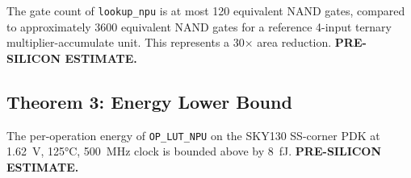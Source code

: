 \begin{corollary}
\label{cor:no_star_area}
The gate count of \texttt{lookup\_npu} is at most 120 equivalent NAND
gates, compared to approximately 3600 equivalent NAND gates for a
reference 4-input ternary multiplier-accumulate unit.  This represents
a 30$\times$ area reduction.  \textbf{PRE-SILICON ESTIMATE.}
\end{corollary}

\subsection{Theorem 3: Energy Lower Bound}
\label{subsec:thm_energy}

\begin{theorem}
\label{thm:energy_8fj}
The per-operation energy of \texttt{OP\_LUT\_NPU} on the SKY130 SS-corner
PDK at 1.62~V, 125°C, 500~MHz clock is bounded above by 8~fJ.
\textbf{PRE-SILICON ESTIMATE.}
\end{theorem}

